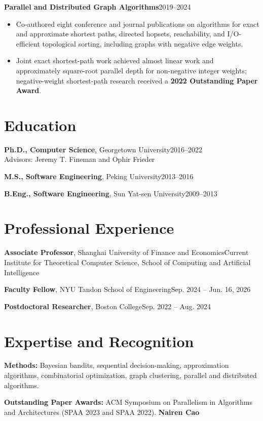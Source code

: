 \documentclass[10pt,a4paper]{article}
\newcommand{\project}[2]{\textbf{#1}\hfill{\small\color{ink}#2}\par}
\begin{document}
\vspace{4pt}
\project{Parallel and Distributed Graph Algorithms}{2019--2024}
\begin{itemize}
\item Co-authored eight conference and journal publications on algorithms for exact and approximate shortest paths, directed hopsets, reachability, and I/O-efficient topological sorting, including graphs with negative edge weights.
\item Joint exact shortest-path work achieved almost linear work and approximately square-root parallel depth for non-negative integer weights; negative-weight shortest-path research received a \textbf{2022 Outstanding Paper Award}.
\end{itemize}

\section{Education}
\textbf{Ph.D., Computer Science}, Georgetown University\hfill 2016--2022\\
{\small Advisors: Jeremy T. Fineman and Ophir Frieder}\par
\textbf{M.S., Software Engineering}, Peking University\hfill 2013--2016\par
\textbf{B.Eng., Software Engineering}, Sun Yat-sen University\hfill 2009--2013

\section{Professional Experience}
\textbf{Associate Professor}, Shanghai University of Finance and Economics\hfill Current\\
{\small Institute for Theoretical Computer Science, School of Computing and Artificial Intelligence}\par
\textbf{Faculty Fellow}, NYU Tandon School of Engineering\hfill Sep. 2024 -- Jun. 16, 2026\par
\textbf{Postdoctoral Researcher}, Boston College\hfill Sep. 2022 -- Aug. 2024

\section{Expertise and Recognition}
\textbf{Methods:} Bayesian bandits, sequential decision-making, approximation algorithms, combinatorial optimization, graph clustering, parallel and distributed algorithms.\par
\textbf{Outstanding Paper Awards:} ACM Symposium on Parallelism in Algorithms and Architectures (SPAA 2023 and SPAA 2022).
\newpage
{\Large\bfseries\color{ink}Nairen Cao}\par
\end{document}
